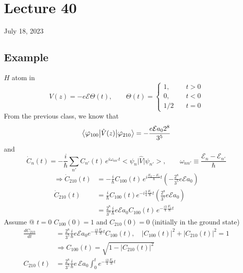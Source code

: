 \documentclass[12pt,fancychapters]{report}
\numberwithin{equation}{section}
\begin{document}
\section{Lecture 40}
July 18, 2023
\subsection{Example}
$H$ atom in
\[
  V(z) = -e\mathcal{E} \Theta (t), \qquad \Theta(t) = \begin{cases}
    1,&\quad t>0\\
    0,&\quad t<0\\
    1/2&\quad t=0
  \end{cases}
\]
From the previous class, we know that
\[
\big<\mathlarger{\varphi}_{100}\big|\hat{V}(z)\big|\mathlarger{\varphi}_{210}\big> = 
-\frac{e\mathcal{E}a_02^8}{3^5}
\]
and 
\[
  \dot{C}_n(t) =-\frac{i}{\hbar} \sum_{n'}C_{n'}(t)\,e^{i\omega_{nn'}t}
  \big<\psi_n\big|\hat{V}\big|\psi_{n'}\big>, \qquad \omega_{nn'} \equiv \frac{\mathcal{E}_n-
  \mathcal{E}_{n'}}{\hbar}
\]
\begin{align*}
  \Rightarrow \dot{C}_{210}(t)&= -\frac{i}{\hbar}C_{100}(t)\,e^{i\frac{E_2-E_1}{\hbar}t}
  \left(-\frac{2^8}{3^5}e\mathcal{E}a_0\right)\\
  \dot{C}_{210}(t) &= \frac{i}{\hbar}C_{100}(t)e^{-i\frac{3}{4}\frac{E_1}{\hbar} t}
  \left(\frac{2^8}{3^5}e\mathcal{E}a_0 \right)\\
                   &= \frac{2^8}{3^5}\frac{i}{\hbar} e\mathcal{E}a_0 C_{100}
                   (t)\,e^{-\frac{i3}{4}\frac{E_1}{\hbar}t}
\end{align*}
Assume @ $t=0$ $C_{100}(0)=1$ and $C_{210}(0) = 0$ (initially in the ground state)
\begin{align*}
  \frac{dC_{210}}{dt} &= \frac{2^8}{3^5}\frac{i}{\hbar} e\mathcal{E}a_0e^{-\frac{i3}{4}
  \frac{E_1}{\hbar}t}C_{100}(t), \quad \big|C_{100}(t)\big|^2+\big|C_{210}(t)\big|^2 = 1\\
                      &\Rightarrow C_{100}(t) = \sqrt{1-\big|C_{210}(t)\big|^2}\\
    C_{210}(t) &= \frac{2^8}{3^5}\frac{i}{\hbar}e\,\mathcal{E}a_0\int_{0}^{t}
                      e^{-\frac{i3}{4}\frac{E_1}{\hbar}t}
\end{align*}
\end{document}
